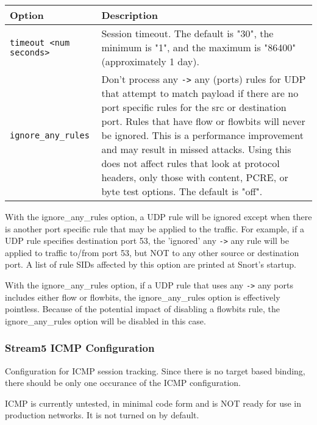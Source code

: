 \documentclass[english]{report}
\newenvironment{note}{
\samepage
    \vspace{10pt}{\textsf{
        {\hspace{7pt}\Huge{$\triangle$\hspace{-12.5pt}{\Large{$^!$}}}}\hspace{5pt}
        {\Large{NOTE}}
    }
    }
   \begin{center}
    \par\vspace{-17pt}

    \begin{lrbox}{\savepar}
    \begin{minipage}[r]{6in}
}
{
    \end{minipage}
    \end{lrbox}
    \fbox{
        \usebox{
            \savepar
	}
    }
    \par\vskip10pt
    \end{center}
}
\newenvironment{note}{
        \begin{rawhtml}
        <p><table border="1"><tr><td><b>
        Note:&nbsp;&nbsp;</b>
        \end{rawhtml}
}{
        \begin{rawhtml}
        </b></td></tr></table></p>
        \end{rawhtml}
}
\begin{document}
\begin{tabular}{| l | p{3.5in} |}
\hline
\textbf{Option} & \textbf{Description}\\
\hline 
\hline 
\texttt{timeout <num seconds>} & Session timeout.  The default is "30", the minimum is "1", and the maximum is "86400" (approximately 1 day).\\
\hline
\texttt{ignore\_any\_rules} & Don't process any \texttt{->} any (ports) rules for UDP that attempt to match payload if there are no port specific rules for the src or destination port.  Rules that have flow or flowbits will never be ignored.  This is a performance improvement and may result in missed attacks.  Using this does not affect rules that look at protocol headers, only those with content, PCRE, or byte test options.  The default is "off".\\
\hline
\end{tabular}

\begin{note}
With the ignore\_any\_rules option, a UDP rule will be ignored except when
there is another port specific rule that may be applied to the traffic.  For
example, if a UDP rule specifies destination port 53, the 'ignored' any \texttt{->} any
rule will be applied to traffic to/from port 53, but NOT to any other
source or destination port.  A list of rule SIDs affected by this option
are printed at Snort's startup.
\end{note}

\begin{note}
With the ignore\_any\_rules option, if a UDP rule that uses any \texttt{->} any
ports includes either flow or flowbits, the ignore\_any\_rules option is
effectively pointless.  Because of the potential impact of disabling a flowbits
rule, the ignore\_any\_rules option will be disabled in this case.
\end{note}

\subsubsection{Stream5 ICMP Configuration}

Configuration for ICMP session tracking.  Since there is no target based
binding, there should be only one occurance of the ICMP configuration.

\begin{note}
ICMP is currently untested, in minimal code form and is NOT ready
for use in production networks.  It is not turned on by default.
\end{note}
\end{document}
